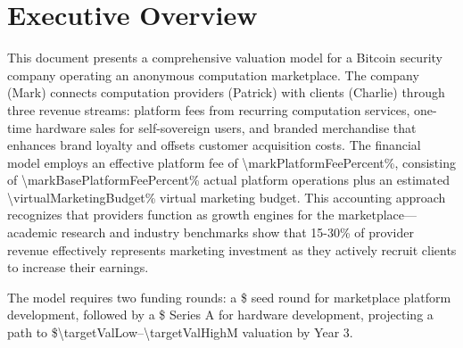 
\section*{Executive Overview}
This document presents a comprehensive valuation model for a Bitcoin security company operating an anonymous computation marketplace. The company (Mark) connects computation providers (Patrick) with clients (Charlie) through three revenue streams: platform fees from recurring computation services, one-time hardware sales for self-sovereign users, and branded merchandise that enhances brand loyalty and offsets customer acquisition costs. The financial model employs an effective platform fee of \num{\markPlatformFeePercent}\%, consisting of \num{\markBasePlatformFeePercent}\% actual platform operations plus an estimated \num{\virtualMarketingBudget}\% virtual marketing budget. This accounting approach recognizes that providers function as growth engines for the marketplace—academic research\cite{eisenmann2006} and industry benchmarks\cite{andreessen2020,bvp2023} show that 15-30\% of provider revenue effectively represents marketing investment as they actively recruit clients to increase their earnings.

The model requires two funding rounds: a \$\numint{\seedAmount} seed round for marketplace platform development, followed by a \$\numint{\seriesAAmount} Series A for hardware development, projecting a path to \$\num{\targetValLow}--\num{\targetValHigh}M valuation by Year 3.
